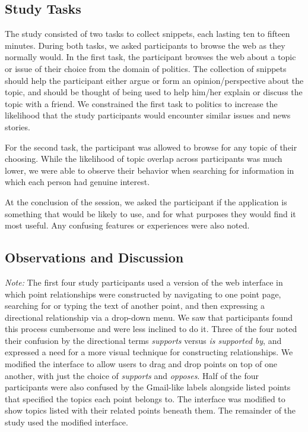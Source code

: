 \documentclass{sig-alt-release2}
\begin{document}
\subsection{Study Tasks}
The study consisted of two tasks to collect snippets, each lasting ten to fifteen minutes. During both tasks, we asked participants to browse the web as they normally would. In the first task, the participant browses the web about a topic or issue of their choice from the domain of politics. The collection of snippets should help the participant either argue or form an opinion/perspective about the topic, and should be thought of being used to help him/her explain or discuss the topic with a friend.  We constrained the first task to politics to increase the likelihood that the study participants would encounter similar issues and news stories.

For the second task, the participant was allowed to browse for any topic of their choosing. While the likelihood of topic overlap across participants was much lower, we were able to observe their behavior when searching for information in which each person had genuine interest.

At the conclusion of the session, we asked the participant if the application is something that would be likely to use, and for what purposes they would find it most useful. Any confusing features or experiences were also noted.

\subsection{Observations and Discussion}


{\it Note:} The first four study participants used a version of the web interface in which point relationships were constructed by navigating to one point page, searching for or typing the text of another point, and then expressing a directional relationship via a drop-down menu. We saw that participants found this process cumbersome and were less inclined to do it. Three of the four noted their confusion by the directional terms {\it supports} versus {\it is supported by}, and expressed a need for a more visual technique for constructing relationships. We modified the interface to allow users to drag and drop points on top of one another, with just the choice of {\it supports} and {\it opposes}. Half of the four participants were also confused by the Gmail-like labels alongside listed points that specified the topics each point belongs to.  The interface was modified to show topics listed with their related points beneath them. The remainder of the study used the modified interface. 
\end{document}
